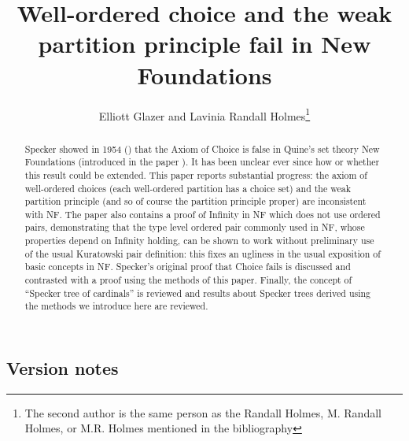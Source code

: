 \documentclass[12pt]{article}
\title{Well-ordered choice and the weak partition principle fail in New Foundations}
\author{Elliott Glazer and Lavinia Randall Holmes\footnote{The second author is the same person as the Randall Holmes, M. Randall Holmes, or M.R. Holmes mentioned in the bibliography}}
\begin{document}
\maketitle

\begin{abstract}

Specker showed in 1954 (\cite{speckernotac}) that the Axiom of Choice is false in Quine's set theory New Foundations (introduced in the paper \cite{nf}).  It has been unclear ever since how or whether this result could be extended.  This paper reports substantial progress:  the axiom of well-ordered choices (each well-ordered partition has a choice set) and the weak partition principle (and so of course the partition principle proper) are inconsistent with NF.  The paper also contains a proof of Infinity in NF which does not use ordered pairs, demonstrating that the type level ordered pair commonly used in NF, whose properties depend on Infinity holding, can be shown to work without preliminary use of the usual Kuratowski pair definition:  this fixes an ugliness in the usual exposition of basic concepts in NF.   Specker's original proof that Choice fails is discussed and contrasted with a proof using the methods of this paper.  Finally, the concept of ``Specker tree of cardinals'' is reviewed and results about Specker trees derived using the methods we introduce here are reviewed.

\end{abstract}

\subsection{Version notes}
\end{document}
